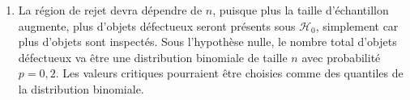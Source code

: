 \begin{solution}{6.1}
\begin{enumerate}
\begin{knitrout}
\end{knitrout}
Bien que la puissance se comporte bien si $p \ne 0,2$ (i.e., elle s'approche de 1), l'erreur de type I est complètement inacceptable: elle est aussi grande que $0,999$ quand $n=100$. Le test n'est pas du tout utile pour ces tailles d'échantillon.

\item La région de rejet devra dépendre de $n$, puisque plus la taille d'échantillon augmente, plus d'objets défectueux seront présents sous $\mathcal{H}_0$, simplement car plus d'objets sont inspectés. Sous l'hypothèse nulle, le nombre total d'objets défectueux va être une distribution binomiale de taille $n$ avec probabilité $p=0,2$. Les valeurs critiques pourraient être choisies comme des quantiles de la distribution binomiale.
\end{enumerate}
\end{solution}
